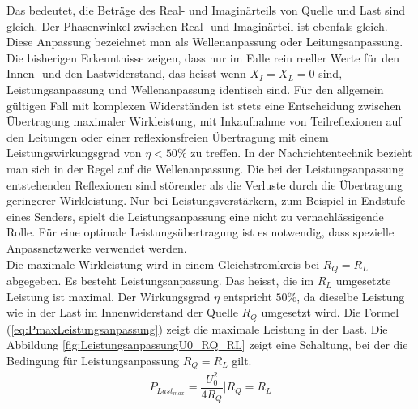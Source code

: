 Das bedeutet, die Beträge des Real- und Imaginärteils von Quelle und Last sind gleich.  Der Phasenwinkel zwischen Real- und Imaginärteil ist ebenfals gleich. Diese Anpassung bezeichnet man als Wellenanpassung oder Leitungsanpassung. Die bisherigen Erkenntnisse zeigen, dass nur im Falle rein reeller Werte für den Innen- und den  Lastwiderstand, das heisst wenn $X_I = X_L = 0$ sind, Leistungsanpassung und Wellenanpassung identisch sind. Für den allgemein gültigen Fall mit komplexen Widerständen ist stets eine Entscheidung zwischen Übertragung maximaler Wirkleistung,  mit Inkaufnahme von Teilreflexionen auf den Leitungen oder einer reflexionsfreien Übertragung mit einem Leistungswirkungsgrad von $\eta <50 \%$ zu treffen. In der Nachrichtentechnik bezieht man sich in der Regel auf die Wellenanpassung. Die bei der Leistungsanpassung entstehenden Reflexionen  sind störender als die Verluste durch die Übertragung geringerer Wirkleistung. Nur bei Leistungsverstärkern, zum Beispiel in Endstufe eines Senders, spielt die Leistungsanpassung eine nicht zu vernachlässigende Rolle. Für eine optimale Leistungsübertragung ist es notwendig, dass spezielle Anpassnetzwerke verwendet werden. \\

Die maximale Wirkleistung wird in einem Gleichstromkreis bei $R_Q = R_L$ abgegeben. Es besteht Leistungsanpassung. Das heisst, die im $R_L$ umgesetzte Leistung ist maximal. Der Wirkungsgrad $\eta$ entspricht $50\%$, da dieselbe Leistung wie in der Last im Innenwiderstand der Quelle $R_Q$ umgesetzt wird. Die Formel (\ref{eq:PmaxLeistungsanpassung}) zeigt die maximale Leistung in der Last. Die Abbildung \ref{fig:LeistungsanpassungU0_RQ_RL} zeigt eine Schaltung, bei der die Bedingung für Leistungsanpassung $R_Q = R_L$ gilt.
\begin{eqnarray}\label{eq:PmaxLeistungsanpassung}
P_{Last_{max}}=\dfrac{U_{0}^2}{4R_Q} | R_Q=R_L
\end{eqnarray}

